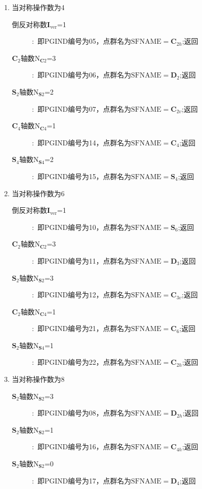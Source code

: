 \documentclass{article}      %
\begin{document}
\begin{enumerate}
\begin{enumerate}
	\item 当对称操作数为4
		\begin{description}
			\item[倒反对称数$\mathbf{I}_{\mathrm{ver}}$=1]:~即\textrm{PGIND}编号为05，点群名为$\mathrm{SFNAME}=\mathbf{C}_{2h}$;返回
			\item[$\mathbf{C}_2$轴数$\mathrm{N}_{\mathbf{C}2}$=3]:~即\textrm{PGIND}编号为06，点群名为$\mathrm{SFNAME}=\mathbf{D}_2$;返回
			\item[$\mathbf{S}_2$轴数$\mathrm{N}_{\mathbf{S}2}$=2]:~即\textrm{PGIND}编号为07，点群名为$\mathrm{SFNAME}=\mathbf{C}_{2v}$;返回
			\item[$\mathbf{C}_4$轴数$\mathrm{N}_{\mathbf{C}4}$=1]:~即\textrm{PGIND}编号为14，点群名为$\mathrm{SFNAME}=\mathbf{C}_4$;返回
			\item[$\mathbf{S}_4$轴数$\mathrm{N}_{\mathbf{S}4}$=2]:~即\textrm{PGIND}编号为15，点群名为$\mathrm{SFNAME}=\mathbf{S}_{4}$;返回
		\end{description}
			\item 当对称操作数为6
		\begin{description}
			\item[倒反对称数$\mathbf{I}_{\mathrm{ver}}$=1]:~即\textrm{PGIND}编号为10，点群名为$\mathrm{SFNAME}=\mathbf{S}_{6}$;返回
			\item[$\mathbf{C}_2$轴数$\mathrm{N}_{\mathbf{C}2}$=3]:~即\textrm{PGIND}编号为11，点群名为$\mathrm{SFNAME}=\mathbf{D}_3$;返回
			\item[$\mathbf{S}_2$轴数$\mathrm{N}_{\mathbf{S}2}$=3]:~即\textrm{PGIND}编号为12，点群名为$\mathrm{SFNAME}=\mathbf{C}_{3v}$;返回
			\item[$\mathbf{C}_2$轴数$\mathrm{N}_{\mathbf{C}4}$=1]:~即\textrm{PGIND}编号为21，点群名为$\mathrm{SFNAME}=\mathbf{C}_6$;返回
			\item[$\mathbf{S}_2$轴数$\mathrm{N}_{\mathbf{S}4}$=1]:~即\textrm{PGIND}编号为22，点群名为$\mathrm{SFNAME}=\mathbf{C}_{2h}$;返回
		\end{description}
			\item 当对称操作数为8
		\begin{description}
			\item[$\mathbf{S}_2$轴数$\mathrm{N}_{\mathbf{S}2}$=3]:~即\textrm{PGIND}编号为08，点群名为$\mathrm{SFNAME}=\mathbf{D}_{2h}$;返回
			\item[$\mathbf{S}_2$轴数$\mathrm{N}_{\mathbf{S}2}$=1]:~即\textrm{PGIND}编号为16，点群名为$\mathrm{SFNAME}=\mathbf{C}_{4h}$;返回
			\item[$\mathbf{S}_2$轴数$\mathrm{N}_{\mathbf{S}2}$=0]:~即\textrm{PGIND}编号为17，点群名为$\mathrm{SFNAME}=\mathbf{D}_4$;返回

\end{description}
\end{enumerate}
\end{enumerate}
\end{document}
